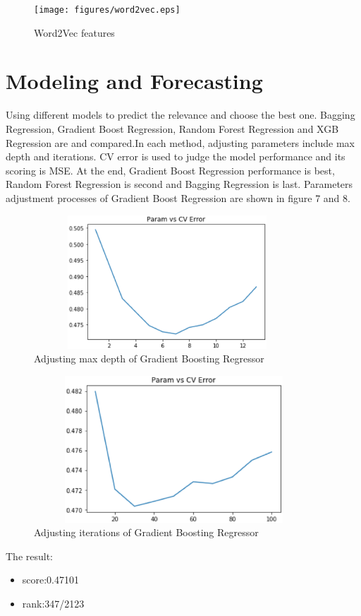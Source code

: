\begin{figure}[htb]
	\centering
	\texttt{[image: figures/word2vec.eps]}
	\caption{Word2Vec features
	}\label{straddltimeScale}
\end{figure}

\section{Modeling and Forecasting} \label{sec-experiment}
\noindent Using different models to predict the relevance and choose the best one. Bagging Regression, Gradient Boost Regression, Random Forest Regression and XGB Regression are and compared.In each method, adjusting parameters include max depth and iterations. CV error is used to judge the model performance and its scoring is MSE. At the end,  Gradient Boost Regression performance is best, Random Forest Regression is second and Bagging Regression is last. Parameters adjustment processes of Gradient Boost Regression are shown in figure 7 and 8.  


\begin{figure}[htb]
	\centering
	\includegraphics[width=10cm, height=5cm]{figures/adjust3.eps}
	\caption{Adjusting max depth of Gradient Boosting Regressor
	}\label{straddltimeScale}
\end{figure}
\begin{figure}[htb]
	\centering
	\includegraphics[width=10.5cm, height=5.5cm]{figures/adjust2.eps}
	\caption{Adjusting iterations of Gradient Boosting Regressor
	}\label{straddltimeScale}
\end{figure}
\noindent The result:
	\begin{itemize}
	\item score:0.47101
	\smallskip
	\item rank:347/2123
\end{itemize}

